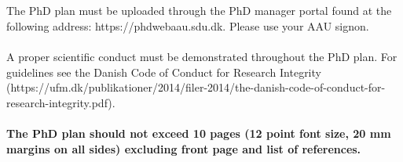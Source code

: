 \\
\\
The PhD plan must be uploaded through the PhD manager portal found at the following address: https://phdwebaau.sdu.dk. Please use your AAU signon.
\\
\\
A proper scientific conduct must be demonstrated throughout the PhD plan. For guidelines see the Danish Code of Conduct for Research Integrity (https://ufm.dk/publikationer/2014/filer-2014/the-danish-code-of-conduct-for-research-integrity.pdf).\\
\\
\textbf{The PhD plan should not exceed 10 pages (12 point font size, 20 mm margins on all sides) excluding front page and list of references.}\\
\\